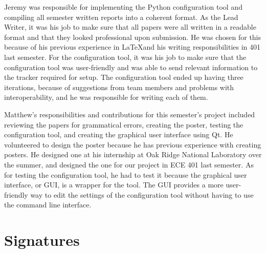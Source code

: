 \documentclass[12 pt]{article}
\begin{document}
	Jeremy was responsible for implementing the Python configuration tool and compiling all semester written reports into a coherent format. As the Lead Writer, it was his job to make sure that all papers were all written in a readable format and that they looked professional upon submission. He was chosen for this because of his previous experience in \LaTeX and his writing responsibilities in 401 last semester. For the configuration tool, it was his job to make sure that the configuration tool was user-friendly and was able to send relevant information to the tracker required for setup. The configuration tool ended up having three iterations, because of suggestions from team members and problems with interoperability, and he was responsible for writing each of them.
	
	Matthew's responsibilities and contributions for this semester's project included reviewing the papers for grammatical errors, creating the poster, testing the configuration tool, and creating the graphical user interface using Qt. He volunteered to design the poster because he has previous experience with creating posters. He designed one at his internship at Oak Ridge National Laboratory over the summer, and designed the one for our project in ECE 401 last semester. As for testing the configuration tool, he had to test it because the graphical user interface, or GUI, is a wrapper for the tool. The GUI provides a more user-friendly way to edit the settings of the configuration tool without having to use the command line interface.
	\section{Signatures}
\end{document}
